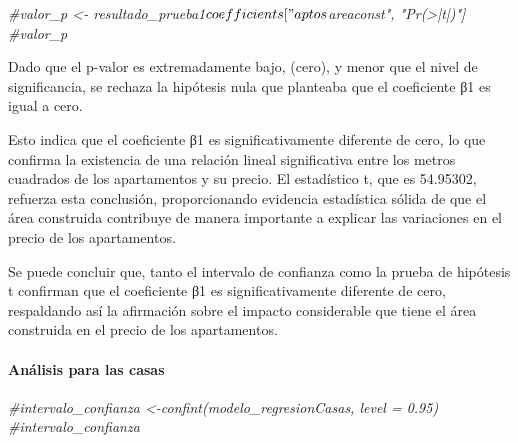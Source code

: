 \documentclass[
]{article}
\newenvironment{Shaded}{\begin{snugshade}}{\end{snugshade}}
\newcommand{\CommentTok}[1]{\textcolor[rgb]{0.56,0.35,0.01}{\textit{#1}}}
\begin{document}
\begin{Shaded}
\begin{Highlighting}[]
\CommentTok{\#valor\_p \textless{}{-} resultado\_prueba1$coefficients["aptos$areaconst", "Pr(\textgreater{}|t|)"]}
\CommentTok{\#valor\_p}
\end{Highlighting}
\end{Shaded}

Dado que el p-valor es extremadamente bajo, (cero), y menor que el nivel
de significancia, se rechaza la hipótesis nula que planteaba que el
coeficiente β1 es igual a cero.

Esto indica que el coeficiente β1 es significativamente diferente de
cero, lo que confirma la existencia de una relación lineal significativa
entre los metros cuadrados de los apartamentos y su precio. El
estadístico t, que es 54.95302, refuerza esta conclusión, proporcionando
evidencia estadística sólida de que el área construida contribuye de
manera importante a explicar las variaciones en el precio de los
apartamentos.

Se puede concluir que, tanto el intervalo de confianza como la prueba de
hipótesis t confirman que el coeficiente β1 es significativamente
diferente de cero, respaldando así la afirmación sobre el impacto
considerable que tiene el área construida en el precio de los
apartamentos.

\paragraph{Análisis para las casas}\label{anuxe1lisis-para-las-casas}

\begin{Shaded}
\begin{Highlighting}[]
\CommentTok{\#intervalo\_confianza \textless{}{-}confint(modelo\_regresionCasas, level = 0.95)}
\CommentTok{\#intervalo\_confianza}
\end{Highlighting}
\end{Shaded}
\end{document}
